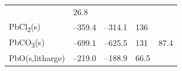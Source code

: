 \documentclass[
]{book}
\theoremstyle{definition}
\theoremstyle{definition}
\theoremstyle{definition}
\theoremstyle{remark}
\begin{document}
\begin{longtable}[]{@{}lllll@{}}
\begin{minipage}[t]{0.18\columnwidth}
\end{minipage} & \begin{minipage}[t]{0.18\columnwidth}\raggedright
26.8\strut
\end{minipage}\tabularnewline
\begin{minipage}[t]{0.10\columnwidth}\raggedright
PbCl\textsubscript{2}(s)\strut
\end{minipage} & \begin{minipage}[t]{0.19\columnwidth}\raggedright
--359.4\strut
\end{minipage} & \begin{minipage}[t]{0.20\columnwidth}\raggedright
--314.1\strut
\end{minipage} & \begin{minipage}[t]{0.18\columnwidth}\raggedright
136\strut
\end{minipage} & \begin{minipage}[t]{0.18\columnwidth}\raggedright
\strut
\end{minipage}\tabularnewline
\begin{minipage}[t]{0.10\columnwidth}\raggedright
PbCO\textsubscript{3}(s)\strut
\end{minipage} & \begin{minipage}[t]{0.19\columnwidth}\raggedright
--699.1\strut
\end{minipage} & \begin{minipage}[t]{0.20\columnwidth}\raggedright
--625.5\strut
\end{minipage} & \begin{minipage}[t]{0.18\columnwidth}\raggedright
131\strut
\end{minipage} & \begin{minipage}[t]{0.18\columnwidth}\raggedright
87.4\strut
\end{minipage}\tabularnewline
\begin{minipage}[t]{0.10\columnwidth}\raggedright
PbO(s,litharge)\strut
\end{minipage} & \begin{minipage}[t]{0.19\columnwidth}\raggedright
--219.0\strut
\end{minipage} & \begin{minipage}[t]{0.20\columnwidth}\raggedright
--188.9\strut
\end{minipage} & \begin{minipage}[t]{0.18\columnwidth}\raggedright
66.5\strut
\end{minipage} & \begin{minipage}[t]{0.18\columnwidth}\raggedright

\end{minipage}
\end{longtable}
\end{document}
